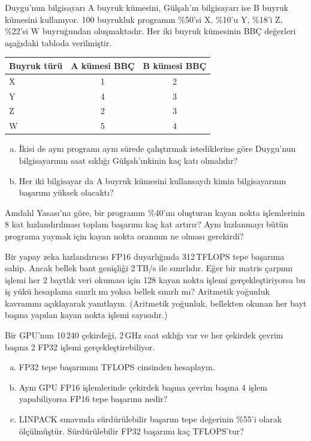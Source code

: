 \begin{alistirma}[\orta]
Duygu'nun bilgisayarı A buyruk kümesini, Gülşah'ın bilgisayarı ise B buyruk kümesini kullanıyor. 100 buyrukluk programın \%50'si X, \%10'u Y, \%18'i Z, \%22'si W buyruğundan oluşmaktadır. Her iki buyruk kümesinin BBÇ değerleri aşağıdaki tabloda verilmiştir.

\begin{center}
\small
\begin{tabular}{lcc}
\toprule
\textbf{Buyruk türü} & \textbf{A kümesi BBÇ} & \textbf{B kümesi BBÇ} \\
\midrule
X & 1 & 2 \\
Y & 4 & 3 \\
Z & 2 & 3 \\
W & 5 & 4 \\
\bottomrule
\end{tabular}
\end{center}

\begin{enumerate}[(a)]
    \item İkisi de aynı programı aynı sürede çalıştırmak istediklerine göre Duygu'nun bilgisayarının saat sıklığı Gülşah'ınkinin kaç katı olmalıdır?
    \item Her iki bilgisayar da A buyruk kümesini kullansaydı kimin bilgisayarının başarımı yüksek olacaktı?
\end{enumerate}
\end{alistirma}

\begin{alistirma}[\orta]
Amdahl Yasası'na göre, bir programın \%40'ını oluşturan kayan nokta işlemlerinin 8 kat hızlandırılması toplam başarımı kaç kat artırır? Aynı hızlanmayı bütün programa yaymak için kayan nokta oranının ne olması gerekirdi?
\end{alistirma}

\begin{alistirma}[\orta]
Bir yapay zeka hızlandırıcısı FP16 duyarlığında 312\,TFLOPS tepe başarıma sahip. Ancak bellek bant genişliği 2\,TB/s ile sınırlıdır. Eğer bir matris çarpımı işlemi her 2 baytlık veri okuması için 128 kayan nokta işlemi gerçekleştiriyorsa bu iş yükü hesaplama sınırlı mı yoksa bellek sınırlı mı? Aritmetik yoğunluk kavramını açıklayarak yanıtlayın. (Aritmetik yoğunluk, bellekten okunan her bayt başına yapılan kayan nokta işlemi sayısıdır.)
\end{alistirma}

\begin{alistirma}[\orta]
Bir GPU'nun 10\,240 çekirdeği, 2\,GHz saat sıklığı var ve her çekirdek çevrim başına 2 FP32 işlemi gerçekleştirebiliyor.
\begin{enumerate}[(a)]
    \item FP32 tepe başarımını TFLOPS cinsinden hesaplayın.
    \item Aynı GPU FP16 işlemlerinde çekirdek başına çevrim başına 4 işlem yapabiliyorsa FP16 tepe başarımı nedir?
    \item LINPACK sınavında sürdürülebilir başarım tepe değerinin \%55'i olarak ölçülmüştür. Sürdürülebilir FP32 başarımı kaç TFLOPS'tur?
\end{enumerate}
\end{alistirma}


